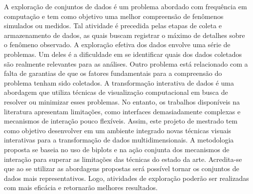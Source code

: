 \begin{resumo}
%
A exploração de conjuntos de dados é um problema abordado
com frequência em computação e tem como objetivo uma melhor
compreensão de fenômenos simulados ou medidos.
%
Tal atividade é precedida pelas etapas de coleta e
armazenamento de dados, as quais buscam registrar o máximo
de detalhes sobre o fenômeno observado.
%
A exploração efetiva dos dados envolve uma série de
problemas. 
%
Um deles é a dificuldade em se identificar quais
dos dados coletados são realmente relevantes para as
análises. 
%
Outro problema está relacionado com a falta de
garantias de que os fatores fundamentais para a compreensão
do problema tenham sido coletados.
% 
A transformação interativa de dados é uma abordagem que
utiliza técnicas de visualização computacional em busca de
resolver ou minimizar esses problemas. 
%
No entanto, os trabalhos disponíveis na literatura
apresentam limitações, como interfaces demasiadamente
complexas e mecanismos de interação pouco flexíveis. 
%
Assim, este projeto de mestrado tem como objetivo
desenvolver em um ambiente integrado novas técnicas visuais
interativas para a transformação de dados multidimensionais.
%
A metodologia proposta se baseia no uso de biplots e na
ação conjunta dos mecanismos de interação para superar as
limitações das técnicas do estado da arte.
%
Acredita-se que ao se utilizar as abordagens propostas 
será possível tornar os conjuntos de dados mais
representativos. 
%
Logo, atividades de exploração poderão ser
realizadas com mais eficácia e retornarão melhores
resultados.
\end{resumo}
